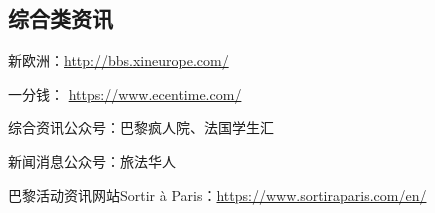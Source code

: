 \subsection{综合类资讯}
新欧洲：\href{http://bbs.xineurope.com/}{http://bbs.xineurope.com/} 

一分钱： \href{https://www.ecentime.com/}{https://www.ecentime.com/} 

综合资讯公众号：巴黎疯人院、法国学生汇

新闻消息公众号：旅法华人

巴黎活动资讯网站Sortir à Paris：\href{https://www.sortiraparis.com/en/}{https://www.sortiraparis.com/en/}
